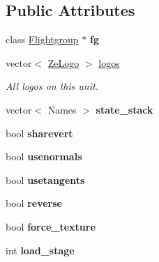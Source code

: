 \subsection*{Public Attributes}
\begin{DoxyCompactItemize}
\item 
class \hyperlink{classFlightgroup}{Flightgroup} $\ast$ {\bfseries fg}\hypertarget{structMeshXML_a71454b2388ab88035668264c82252ed7}{}\label{structMeshXML_a71454b2388ab88035668264c82252ed7}

\item 
vector$<$ \hyperlink{structMeshXML_1_1ZeLogo}{Ze\+Logo} $>$ \hyperlink{structMeshXML_ab11335b4dcc8b4499f2d623c1c3385e1}{logos}\hypertarget{structMeshXML_ab11335b4dcc8b4499f2d623c1c3385e1}{}\label{structMeshXML_ab11335b4dcc8b4499f2d623c1c3385e1}

\begin{DoxyCompactList}\small\item\em All logos on this unit. \end{DoxyCompactList}\item 
vector$<$ Names $>$ {\bfseries state\+\_\+stack}\hypertarget{structMeshXML_a13b6342f88f24b80479e2058d965e0a3}{}\label{structMeshXML_a13b6342f88f24b80479e2058d965e0a3}

\item 
bool {\bfseries sharevert}\hypertarget{structMeshXML_a36242b34bc8d89bd56481bb96d460824}{}\label{structMeshXML_a36242b34bc8d89bd56481bb96d460824}

\item 
bool {\bfseries usenormals}\hypertarget{structMeshXML_ae1668226ece5da8ae1091cacdc2f6adb}{}\label{structMeshXML_ae1668226ece5da8ae1091cacdc2f6adb}

\item 
bool {\bfseries usetangents}\hypertarget{structMeshXML_aaa4586247294721dc58f969a6725406d}{}\label{structMeshXML_aaa4586247294721dc58f969a6725406d}

\item 
bool {\bfseries reverse}\hypertarget{structMeshXML_ac9ff915bd3656c7c886c1bd67d8caa67}{}\label{structMeshXML_ac9ff915bd3656c7c886c1bd67d8caa67}

\item 
bool {\bfseries force\+\_\+texture}\hypertarget{structMeshXML_af9292da0a9d32d6aa0fe80642e9fafe0}{}\label{structMeshXML_af9292da0a9d32d6aa0fe80642e9fafe0}

\item 
int {\bfseries load\+\_\+stage}\hypertarget{structMeshXML_ac723efeb25b9c7e091408b0c62cc0082}{}\label{structMeshXML_ac723efeb25b9c7e091408b0c62cc0082}


\end{DoxyCompactItemize}
